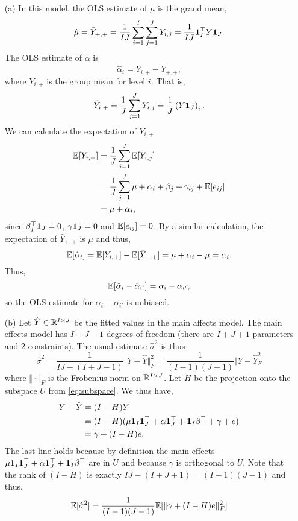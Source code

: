 \begin{enumerate}
	\item[(a)] In this model, the OLS estimate of $\mu$ is the grand mean,
	\[\hat{\mu}=\bar{Y}_{+,+}=\frac{1}{IJ}\sum_{i=1}^I\sum_{j=1}^J Y_{i,j} = \frac{1}{IJ} \mathbf 1_I^\top  Y \mathbf 1_J. \]
	The OLS estimate of $\alpha$ is
	\[\hat{\alpha}_i = \bar{Y}_{i,+}-\bar{Y}_{+,+},  \]
	where $\bar{Y}_{i,+}$ is the group mean for level $i$. That is, 
	\[\bar{Y}_{i,+} = \frac{1}{J}\sum_{j=1}^J Y_{i,j}=\frac{1}{J}\left(Y\mathbf 1_J\right)_i .\] 
	We can calculate the expectation of $\bar{Y}_{i,+}$
	\begin{align*}
		\mathbb{E}[\bar{Y}_{i,+}]&=\frac{1}{J}\sum_{j=1}^J {\mathbb E}[Y_{i,j}]\\
		&=\frac{1}{J}\sum_{j=1}^J \mu+\alpha_i+\beta_j +\gamma_{ij} + {\mathbb E}[e_{ij}]\\
		&=\mu+\alpha_i,
	\end{align*}
	since $\beta_j^\top  \mathbf 1_J = 0$, $\gamma \mathbf 1_J=0$ and ${\mathbb E}[e_{ij}]=0$. By a similar calculation, the expectation of $\bar{Y}_{+,+}$ is $\mu$ and thus,
	\[{\mathbb E}[\hat{\alpha}_i] = {\mathbb E}[Y_{i,+}] - {\mathbb E}[\bar{Y}_{+,+}] = \mu +\alpha_i - \mu = \alpha_i. \]
	Thus,
	\[{\mathbb E}[\hat{\alpha}_i-\hat{\alpha}_{i'}] = \alpha_i-\alpha_{i'}, \]
	so the OLS estimate for $\alpha_i-\alpha_{i'}$ is unbiased.
	\item[(b)] Let $\hat{Y} \in \mathbb{R}^{I\times J}$ be the fitted values in the main affects model. The main effects model has $I+J-1$ degrees of freedom (there are $I+J+1$ parameters and $2$ constraints). The usual estimate $\hat{\sigma}^2$ is thus
	\[\hat{\sigma}^2 = \frac{1}{IJ-(I+J-1)}\Vert Y - \hat{Y} \Vert_F^2 = \frac{1}{(I-1)(J-1)}\Vert Y - \hat{Y}_F^2 \]
	where $\Vert \cdot \Vert_F$ is the Frobenius norm on $\mathbb{R}^{I \times J}$. Let $H$ be the projection onto the subspace $U$ from \eqref{eq:subspace}. We thus have,
	\begin{align*}
		Y-\hat{Y}&=(I-H)Y\\
		&=(I-H)(\mu\mathbf 1_I\mathbf 1^\top _J + \alpha\mathbf 1_J^\top  + \mathbf 1_I\beta^\top  +\gamma + e)\\
		&=\gamma + (I-H)e.
	\end{align*}
	The last line holds because by definition the main effects $\mu\mathbf 1_I\mathbf 1^\top _J + \alpha\mathbf 1_J^\top  + \mathbf 1_I\beta^\top $ are in $U$ and because $\gamma$ is orthogonal to $U$. Note that the rank of $(I-H)$ is exactly $IJ-(I+J+1)=(I-1)(J-1)$ and thus,
	\begin{align*}
		\bbE[\hat{\sigma}^2]&=\frac{1}{(I-1)(J-1)}\bbE[\Vert \gamma + (I-H)e\Vert_F^2]\\

\end{align*}
\end{enumerate}
